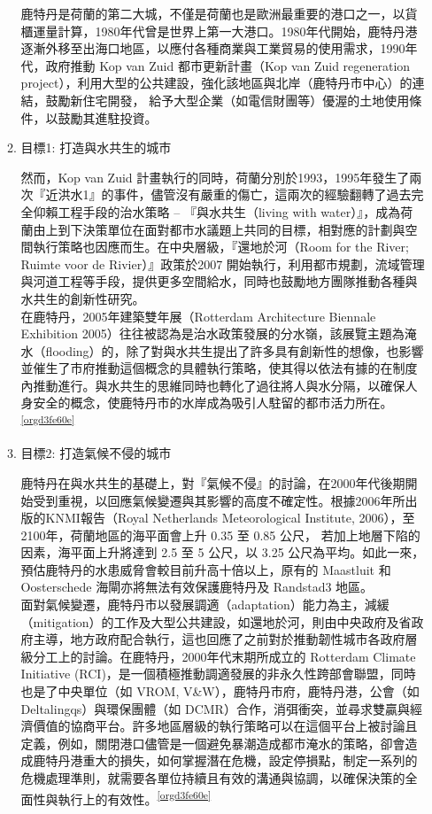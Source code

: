 \documentclass[a4paper,12pt]{article}
\begin{document}
\begin{enumerate}
\begin{enumerate}
鹿特丹是荷蘭的第二大城，不僅是荷蘭也是歐洲最重要的港口之一，以貨櫃運量計算，1980年代曾是世界上第一大港口。1980年代開始，鹿特丹港逐漸外移至出海口地區，以應付各種商業與工業貿易的使用需求，1990年代，政府推動 Kop van Zuid 都市更新計畫（Kop van Zuid regeneration project），利用大型的公共建設，強化該地區與北岸（鹿特丹市中心）的連結，鼓勵新住宅開發， 給予大型企業（如電信財團等）優渥的土地使用條件，以鼓勵其進駐投資。\\

\item 目標1: 打造與水共生的城市
\label{sec:orga68d8da}

然而，Kop van Zuid 計畫執行的同時，荷蘭分別於1993，1995年發生了兩次『近洪水1』的事件，儘管沒有嚴重的傷亡，這兩次的經驗翻轉了過去完全仰賴工程手段的治水策略 – 『與水共生（living with water）』，成為荷蘭由上到下決策單位在面對都市水議題上共同的目標，相對應的計劃與空間執行策略也因應而生。在中央層級，『還地於河（Room for the River; Ruimte voor de Rivier）』政策於2007 開始執行，利用都市規劃，流域管理與河道工程等手段，提供更多空間給水，同時也鼓勵地方團隊推動各種與水共生的創新性研究。\\

在鹿特丹，2005年建築雙年展（Rotterdam Architecture Biennale Exhibition 2005）往往被認為是治水政策發展的分水嶺，該展覽主題為淹水（flooding）的，除了對與水共生提出了許多具有創新性的想像，也影響並催生了市府推動這個概念的具體執行策略，使其得以依法有據的在制度內推動進行。與水共生的思維同時也轉化了過往將人與水分隔，以確保人身安全的概念，使鹿特丹市的水岸成為吸引人駐留的都市活力所在。\textsuperscript{\ref{orgd3fe60e}}\\

\item 目標2: 打造氣候不侵的城市
\label{sec:org54ba722}

鹿特丹在與水共生的基礎上，對『氣候不侵』的討論，在2000年代後期開始受到重視，以回應氣候變遷與其影響的高度不確定性。根據2006年所出版的KNMI報告（Royal Netherlands Meteorological Institute, 2006），至2100年，荷蘭地區的海平面會上升 0.35 至 0.85 公尺， 若加上地層下陷的因素，海平面上升將達到 2.5 至 5 公尺，以 3.25 公尺為平均。如此一來， 預估鹿特丹的水患威脅會較目前升高十倍以上，原有的 Maastluit 和 Oosterschede 海閘亦將無法有效保護鹿特丹及 Randstad3 地區。\\

面對氣候變遷，鹿特丹市以發展調適（adaptation）能力為主，減緩（mitigation）的工作及大型公共建設，如還地於河，則由中央政府及省政府主導，地方政府配合執行，這也回應了之前對於推動韌性城市各政府層級分工上的討論。在鹿特丹，2000年代末期所成立的 Rotterdam Climate Initiative (RCI)，是一個積極推動調適發展的非永久性跨部會聯盟，同時也是了中央單位（如 VROM, V\&W），鹿特丹市府，鹿特丹港，公會（如Deltalingqs）與環保團體（如 DCMR）合作，消弭衝突，並尋求雙贏與經濟價值的協商平台。許多地區層級的執行策略可以在這個平台上被討論且定義，例如，關閉港口儘管是一個避免暴潮造成都市淹水的策略，卻會造成鹿特丹港重大的損失，如何掌握潛在危機，設定停損點，制定一系列的危機處理準則，就需要各單位持續且有效的溝通與協調，以確保決策的全面性與執行上的有效性。\textsuperscript{\ref{orgd3fe60e}}\\


\end{enumerate}
\end{enumerate}
\end{document}
